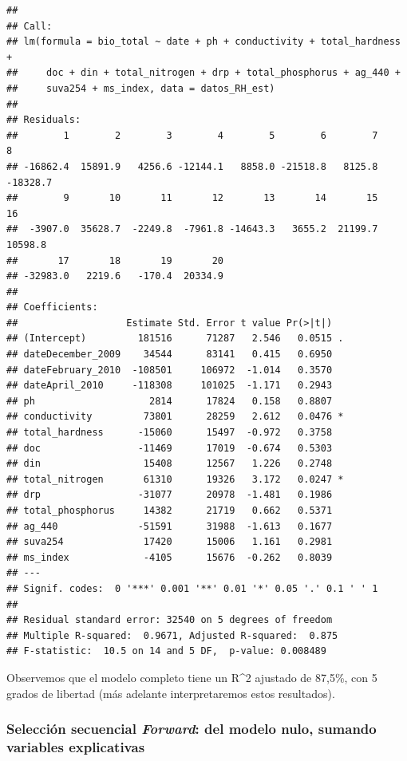 \documentclass[
]{book}
\begin{document}
\begin{verbatim}
## 
## Call:
## lm(formula = bio_total ~ date + ph + conductivity + total_hardness + 
##     doc + din + total_nitrogen + drp + total_phosphorus + ag_440 + 
##     suva254 + ms_index, data = datos_RH_est)
## 
## Residuals:
##        1        2        3        4        5        6        7        8 
## -16862.4  15891.9   4256.6 -12144.1   8858.0 -21518.8   8125.8 -18328.7 
##        9       10       11       12       13       14       15       16 
##  -3907.0  35628.7  -2249.8  -7961.8 -14643.3   3655.2  21199.7  10598.8 
##       17       18       19       20 
## -32983.0   2219.6   -170.4  20334.9 
## 
## Coefficients:
##                   Estimate Std. Error t value Pr(>|t|)  
## (Intercept)         181516      71287   2.546   0.0515 .
## dateDecember_2009    34544      83141   0.415   0.6950  
## dateFebruary_2010  -108501     106972  -1.014   0.3570  
## dateApril_2010     -118308     101025  -1.171   0.2943  
## ph                    2814      17824   0.158   0.8807  
## conductivity         73801      28259   2.612   0.0476 *
## total_hardness      -15060      15497  -0.972   0.3758  
## doc                 -11469      17019  -0.674   0.5303  
## din                  15408      12567   1.226   0.2748  
## total_nitrogen       61310      19326   3.172   0.0247 *
## drp                 -31077      20978  -1.481   0.1986  
## total_phosphorus     14382      21719   0.662   0.5371  
## ag_440              -51591      31988  -1.613   0.1677  
## suva254              17420      15006   1.161   0.2981  
## ms_index             -4105      15676  -0.262   0.8039  
## ---
## Signif. codes:  0 '***' 0.001 '**' 0.01 '*' 0.05 '.' 0.1 ' ' 1
## 
## Residual standard error: 32540 on 5 degrees of freedom
## Multiple R-squared:  0.9671, Adjusted R-squared:  0.875 
## F-statistic:  10.5 on 14 and 5 DF,  p-value: 0.008489
\end{verbatim}

Observemos que el modelo completo tiene un R\^{}2 ajustado de 87,5\%, con 5 grados de libertad (más adelante interpretaremos estos resultados).

\hypertarget{selecciuxf3n-secuencial-forward-del-modelo-nulo-sumando-variables-explicativas}{%
\subsubsection{\texorpdfstring{Selección secuencial \emph{Forward}: del modelo nulo, sumando variables explicativas}{Selección secuencial Forward: del modelo nulo, sumando variables explicativas}}\label{selecciuxf3n-secuencial-forward-del-modelo-nulo-sumando-variables-explicativas}}
\end{document}
